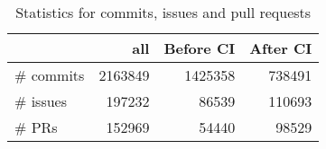 \begin{table}[t]
	\centering
	\caption{Statistics for commits, issues and pull requests}
	\vspace{-0.2cm}
	\label{count_info}
	\begin{tabular}{lrrr}
		\hline
		& all     & Before CI & After CI \\ \hline
		\# commits & 2163849 & 1425358   & 738491   \\ \hline
		\# issues  & 197232  & 86539     & 110693   \\ \hline
		\# PRs      & 152969  & 54440     & 98529    \\ \hline
	\end{tabular}
\end{table}




